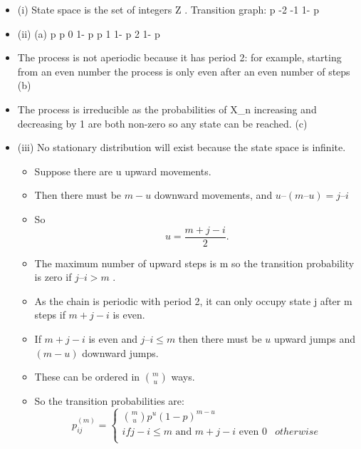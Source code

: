 \documentclass[a4paper,12pt]{article}
\begin{document}
\begin{itemize}
\item (i)
State space is the set of integers Ζ .
Transition graph:
p
-2
-1
1- p
\item (ii)
(a)
p
p
0
1- p
p
1
1- p
2
1- p
\item The process is not aperiodic
because it has period 2:
for example, starting from an even number the process is only even after an even number of steps
(b)
\item The process is irreducible
as the probabilities of X_n increasing and decreasing by 1 are both non-zero so any state can be reached.
(c)
\item (iii)
No stationary distribution will exist because the state space is infinite.

\begin{itemize}
\item Suppose there are u upward movements.
\item Then there must be $m − u$ downward movements,
and $u – ( m – u ) = j – i$
\item So 
\[ u = \frac{m + j − i}{2}. \]
\end{itemize}


\begin{itemize}
\item The maximum number of upward steps is m so the
transition probability is zero if $j – i > m$ .
\item 
As the chain is periodic with period 2, it can only occupy
state j after m steps if $m + j − i$ is even.
\item If $m + j − i$ is even and $j – i \leq m$ then there must be $u$
upward jumps and $( m − u )$ downward jumps.

\item These can be ordered in ${ \displaystyle {m \choose u} }$ ways.
\item So the transition probabilities are:
\[
p_{ij}^{( m )}  = \begin{cases}
{m \choose u} p^{u}(1-p)^{m-u}\\ if j − i \leq m \mbox{ and }m + j − i \mbox{ even }
0 & otherwise\\
\end{cases}
\]
\end{itemize}


\end{itemize}
\end{document}
